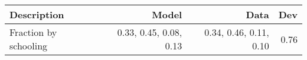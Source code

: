 \begin{tabular}{lrrr}
\hline
Description & Model  & Data  & Dev  \\ 
\hline
Fraction by schooling & 0.33, 0.45, 0.08, 0.13  & 0.34, 0.46, 0.11, 0.10  & 0.76  \\ 
\hline
\end{tabular}%

